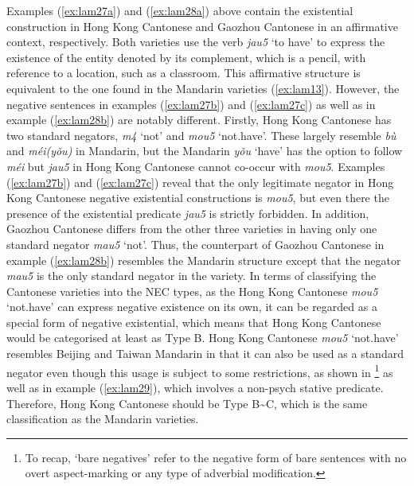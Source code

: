 \documentclass[output=paper,colorlinks,citecolor=brown,chinesefont]{langscibook}
\begin{document}
Examples (\ref{ex:lam27a}) and (\ref{ex:lam28a}) above contain the existential construction in Hong Kong Cantonese and Gaozhou Cantonese in an affirmative context, respectively. Both varieties use the verb \textit{jau5} `to have' to express the existence of the entity denoted by its complement, which is a pencil, with reference to a location, such as a classroom. This affirmative structure is equivalent to the one found in the Mandarin varieties (\ref{ex:lam13}). However, the negative sentences in examples (\ref{ex:lam27b}) and (\ref{ex:lam27c}) as well as in example (\ref{ex:lam28b}) are notably different. Firstly, Hong Kong Cantonese has two standard negators, \textit{m4} `not' and \textit{mou5} `not.have'. These largely resemble \textit{bù} and \textit{méi(yǒu)} in Mandarin, but the Mandarin \textit{yǒu} `have' has the option to follow \textit{méi} but \textit{jau5} in Hong Kong Cantonese cannot co-occur with \textit{mou5}. Examples (\ref{ex:lam27b}) and (\ref{ex:lam27c}) reveal that the only legitimate negator in Hong Kong Cantonese negative existential constructions is \textit{mou5}, but even there the presence of the existential predicate \textit{jau5} is strictly forbidden. In addition, Gaozhou Cantonese differs from the other three varieties in having only one standard negator \textit{mau5} `not'. Thus, the counterpart of Gaozhou Cantonese in example (\ref{ex:lam28b}) resembles the Mandarin structure except that the negator \textit{mau5} is the only standard negator in the variety. In terms of classifying the Cantonese varieties into the NEC types, as the Hong Kong Cantonese \textit{mou5} `not.have' can express negative existence on its own, it can be regarded as a special form of negative existential, which means that Hong Kong Cantonese would be categorised at least as Type B. Hong Kong Cantonese \textit{mou5} `not.have' resembles Beijing and Taiwan Mandarin in that it can also be used as a standard negator even though this usage is subject to some restrictions, as shown in \footnote{To recap, `bare negatives' refer to the negative form of bare sentences with no overt aspect-marking or any type of adverbial modification.} as well as in example (\ref{ex:lam29}), which involves a non-psych stative predicate. Therefore, Hong Kong Cantonese should be Type B\sim C, which is the same classification as the Mandarin varieties.
\end{document}
